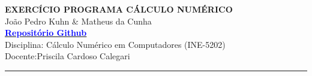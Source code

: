 \begin{center}
    \Large\MakeUppercase{\textbf{Exercício Programa Cálculo Numérico}}\\
    João Pedro Kuhn \& Matheus da Cunha \\
    \href{https://github.com/matheusdacunha70/ExercicioCalculoNumerico}{\textbf{\textcolor{blue}{Repositório Github}}} \\
    Disciplina: Cálculo Numérico em Computadores (INE-5202) \\
    Docente:Priscila Cardoso Calegari \\
    \noindent\rule{\textwidth}{3pt}
\end{center}
